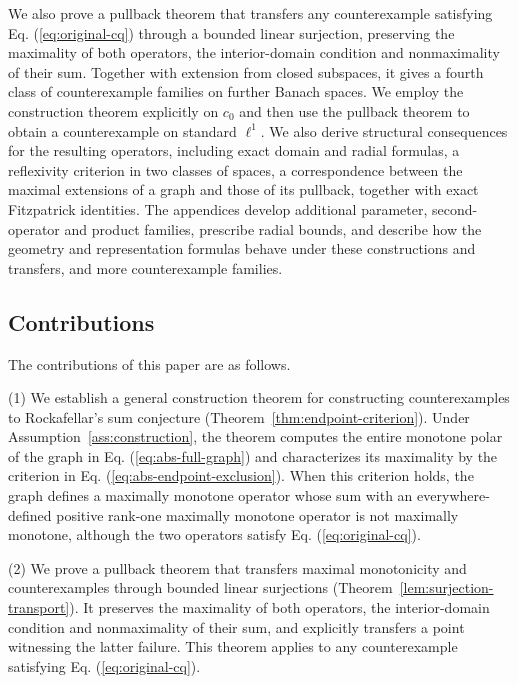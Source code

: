\documentclass[11pt]{article}
\theoremstyle{definition}
\theoremstyle{remark}
\begin{document}
We also prove a pullback theorem that transfers any counterexample satisfying Eq. (\ref{eq:original-cq}) through a bounded linear surjection, preserving the maximality of both operators, the interior-domain condition and nonmaximality of their sum. Together with extension from closed subspaces, it gives a fourth class of counterexample families on further Banach spaces. We employ the construction theorem explicitly on $c_0$ and then use the pullback theorem to obtain a counterexample on standard $\ell^1$.  We also derive structural consequences for the resulting operators, including exact domain and radial formulas, a reflexivity criterion in two classes of spaces, a correspondence between the maximal extensions of a graph and those of its pullback, together with exact Fitzpatrick identities. The appendices develop additional parameter, second-operator and product families, prescribe radial bounds, and describe how the geometry and representation formulas behave under these constructions and transfers, and more counterexample families. 





\subsection{Contributions}
The contributions of this paper are as follows. 

(1) We establish a general construction theorem for constructing counterexamples to Rockafellar's sum conjecture (Theorem~\ref{thm:endpoint-criterion}). Under Assumption~\ref{ass:construction}, the theorem computes the entire monotone polar of the graph in Eq. (\ref{eq:abs-full-graph}) and characterizes its maximality by the criterion in Eq. (\ref{eq:abs-endpoint-exclusion}). When this criterion holds, the graph defines a maximally monotone operator whose sum with an everywhere-defined positive rank-one maximally monotone operator is not maximally monotone, although the two operators satisfy Eq. (\ref{eq:original-cq}). 

(2) We prove a pullback theorem that transfers maximal monotonicity and counterexamples through bounded linear surjections (Theorem~\ref{lem:surjection-transport}). It preserves the maximality of both operators, the interior-domain condition and nonmaximality of their sum, and explicitly transfers a point witnessing the latter failure. This theorem applies to any counterexample satisfying Eq. (\ref{eq:original-cq}). 
\end{document}
